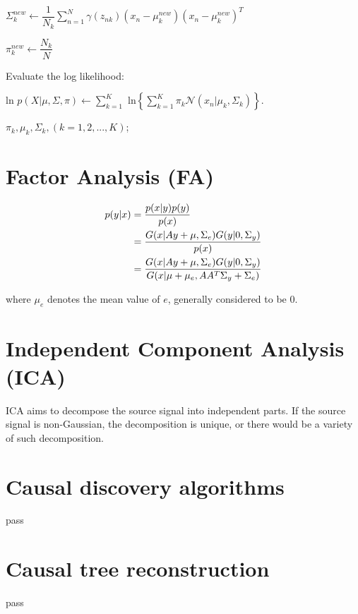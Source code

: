 \documentclass[12pt,a4paper]{article}
\theoremstyle{definition}
\begin{document}
\begin{algorithm}[H]
{		\begin{center}
			$\Sigma^{new}_{k} \leftarrow \dfrac{1}{N_{k}}\sum\limits_{n=1}^{N}\gamma(z_{nk})(x_{n}-\mu^{new}_{k})(x_{n}-\mu^{new}_{k})^{T}$
		\end{center}
		
		\begin{center}
			$\pi^{new}_{k} \leftarrow \dfrac{N_{k}}{N}$
		\end{center}
		
		Evaluate the log likelihood:
		
		\begin{center}
			ln $p(X|\mu,\Sigma,\pi) \leftarrow \sum\limits_{k=1}^{K}$ ln$\left\{\sum\limits_{k=1}^{K}\pi_{k}\mathcal{N}(x_{n}|\mu_{k}, \Sigma_{k})\right\}.$
		\end{center}
	}
	\Return $\pi_{k}, \mu_{k}, \Sigma_{k}, (k=1,2,...,K)$;
\end{algorithm}

\section{Factor Analysis (FA)}

\vspace{-0.03\linewidth}
\begin{large}
\begin{align*}
	\centering	
	p(y|x) &= \dfrac{p(x|y)p(y)}{p(x)} \\
	&= \dfrac{G(x|Ay+\mu,\Sigma_{e})G(y|0,\Sigma_{y})}{p(x)} \\
	&= \dfrac{G(x|Ay+\mu,\Sigma_{e})G(y|0,\Sigma_{y})}{G(x|\mu+\mu_{e},AA^{T}\Sigma_{y}+\Sigma_{e})}
\end{align*}
\end{large}

where $\mu_{e}$ denotes the mean value of $e$, generally considered to be 0.

\section{Independent Component Analysis (ICA)}

ICA aims to decompose the source signal into independent parts. If the source signal is non-Gaussian, the decomposition is unique, or there would be a variety of such decomposition.

\section{Causal discovery algorithms}

pass

\section{Causal tree reconstruction}

pass
\end{document}
